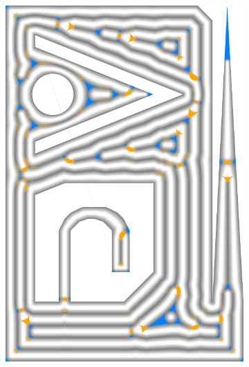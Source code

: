 \begin{figure}
\begin{subfigure}{\figwidth}
\includegraphics[height=\figheight]{sources-validation-gMAT-example-TEST-Distributed-accuracy.png}

\end{subfigure}
\end{figure}
